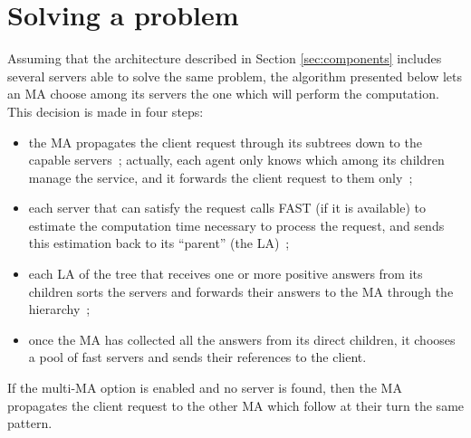 \section{Solving a problem}
\label{sec:solvepb}

Assuming that the architecture described in Section
\ref{sec:components} includes several servers able to solve the same
problem, the algorithm presented below lets an MA choose among its
servers the one which will perform the computation. This decision is
made in four steps:




\begin{itemize}
\item the MA propagates the client request through its subtrees down
  to the capable servers~; actually, each agent only knows which among
  its children manage the service, and it forwards the client request
  to them only~;
\item each server that can satisfy the request calls FAST (if it is
  available) to estimate the computation time necessary to process the
  request, and sends this estimation back to its ``parent'' (the LA)~;
\item each LA of the tree that receives one or more positive answers
  from its children sorts the servers and forwards their answers to
  the MA through the hierarchy~;
\item once the MA has collected all the answers from its direct
  children, it chooses a pool of fast servers and sends their
  references to the client.
\end{itemize}

If the multi-MA option is enabled and no server is found, then the MA
propagates the client request to the other MA which follow at their
turn the same pattern.


